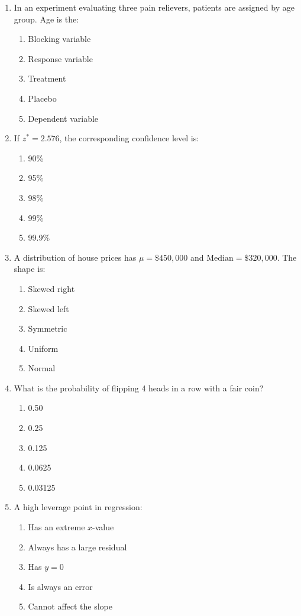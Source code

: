 \begin{enumerate}[resume, leftmargin=1.5em]
  \item In an experiment evaluating three pain relievers, patients are assigned by age group. Age is the:
  \begin{enumerate}[label=(\Alph*)]
    \item Blocking variable \item Response variable \item Treatment \item Placebo \item Dependent variable
  \end{enumerate}

  \item If $z^* = 2.576$, the corresponding confidence level is:
  \begin{enumerate}[label=(\Alph*)]
    \item 90\% \item 95\% \item 98\% \item 99\% \item 99.9\%
  \end{enumerate}

  \item A distribution of house prices has $\mu = \$450,000$ and $\text{Median} = \$320,000$. The shape is:
  \begin{enumerate}[label=(\Alph*)]
    \item Skewed right \item Skewed left \item Symmetric \item Uniform \item Normal
  \end{enumerate}

  \item What is the probability of flipping 4 heads in a row with a fair coin?
  \begin{enumerate}[label=(\Alph*)]
    \item 0.50 \item 0.25 \item 0.125 \item 0.0625 \item 0.03125
  \end{enumerate}

  \item A high leverage point in regression:
  \begin{enumerate}[label=(\Alph*)]
    \item Has an extreme $x$-value \item Always has a large residual \item Has $y = 0$ \item Is always an error \item Cannot affect the slope
  \end{enumerate}


\end{enumerate}
